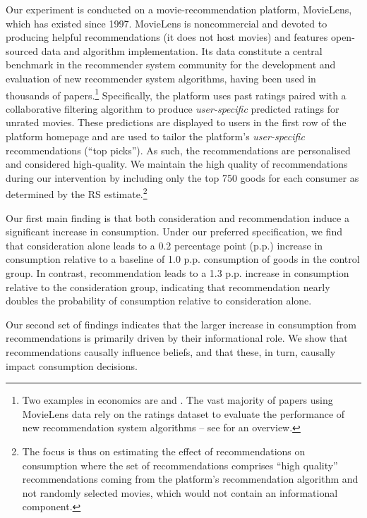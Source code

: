 \documentclass[12pt]{article}
\theoremstyle{newtheorem}
\begin{document}
Our experiment is conducted on a movie-recommendation platform, MovieLens, which has existed since 1997. 
MovieLens is noncommercial and devoted to producing helpful recommendations (it does not host movies) and features open-sourced data and algorithm implementation. Its data constitute a central benchmark in the recommender system community for the development and evaluation of new recommender system algorithms, having been used in thousands of papers.\footnote{
 Two examples in economics are \citet{ChenHarperKonstanLi2010AER} and \citet{Rossi2021}. 
 The vast majority of papers using MovieLens data rely on the ratings dataset to evaluate the performance of new recommendation system algorithms -- see \citet{HarperKonstan2015ACMTIIS} for an overview.
}
Specifically, the platform uses past ratings paired with a collaborative filtering algorithm \citep{HarperKonstan2015ACMTIIS} to produce \emph{user-specific} predicted ratings for unrated movies. These predictions are displayed to users in the first row of the platform homepage and are used to tailor the platform's \emph{user-specific} recommendations (``top picks'').
As such, the recommendations are personalised and considered high-quality. We maintain the high quality of recommendations during our intervention by including only the top 750 goods for each consumer
as determined by the RS estimate.\footnote{
    The focus is thus on estimating the effect of recommendations on consumption where the set of recommendations comprises ``high quality'' recommendations coming from the platform's recommendation algorithm and not randomly selected movies, which would not contain an informational component.
}


Our first main finding is that both consideration and recommendation induce a significant increase in consumption. 
Under our preferred specification, we find that consideration alone leads to a 0.2 percentage point (p.p.) increase in consumption relative to a baseline of 1.0 p.p. consumption of goods in the control group. 
In contrast, recommendation leads to a 1.3 p.p. increase in consumption relative to the consideration group, indicating that recommendation nearly doubles the probability of consumption relative to consideration alone.


Our second set of findings indicates that the larger increase in consumption from recommendations is primarily driven by their informational role. 
We show that recommendations causally influence beliefs, and that these, in turn, causally impact consumption decisions. 
\end{document}
